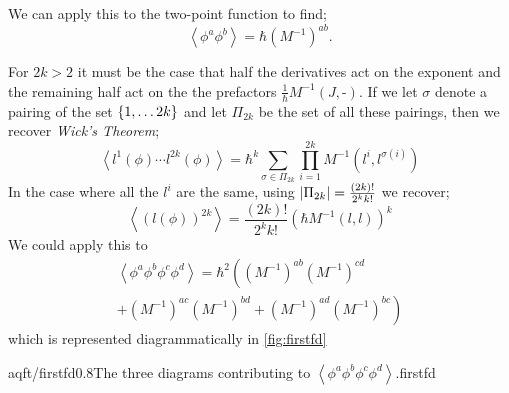 We can apply this to the two-point function to find;\footnotemark
{}
\begin{equation}
\left< \phi^a \phi^b \right> = \hbar(M^{-1})^{ab}. 
\end{equation}
\begin{definitionbox}
For $2k > 2$ it must be the case that half the derivatives act on the exponent and the remaining half act on the the prefactors $\tfrac{1}{\hbar}M^{-1}(J, \text{-})$. If we let $\sigma$ denote a pairing of the set $\set{1, \ldots 2k}$ and let $\Pi_{2k}$ be the set of all these pairings, then we recover \emph{Wick's Theorem};
\begin{equation}
\left< l^1 (\phi)\cdots l^{2k}(\phi) \right> = \hbar^{k}\sum_{\sigma \in \Pi_{2k}}{\prod_{i = 1}^{2k}{M^{-1}(l^i, l^{\sigma(i)})}}
\end{equation}
In the case where all the $l^i$ are the same, using $\abs{\Pi_{2k}} = \tfrac{(2k)!}{2^k k!}$ we recover;
\begin{equation}
\left< \left(l(\phi)\right)^{2k} \right> = \frac{(2k)!}{2^k k!} \left(\hbar M^{-1}(l,l)\right)^k
\end{equation}
We could apply this to 
\begin{multline}
\left< \phi^a \phi^b \phi^c \phi^d \right> = \hbar^2 \left((M^{-1})^{ab}(M^{-1})^{cd}\right. \\ \left.+ (M^{-1})^{ac}(M^{-1})^{bd} + (M^{-1})^{ad}(M^{-1})^{bc}\right)
\end{multline}
which is represented diagrammatically in \autoref{fig:firstfd}
\end{definitionbox}
\begin{mygraphic}{aqft/firstfd}{0.8}{The three diagrams contributing to $\left< \phi^a \phi^b \phi^c \phi^d \right>$.}{firstfd}\end{mygraphic}
